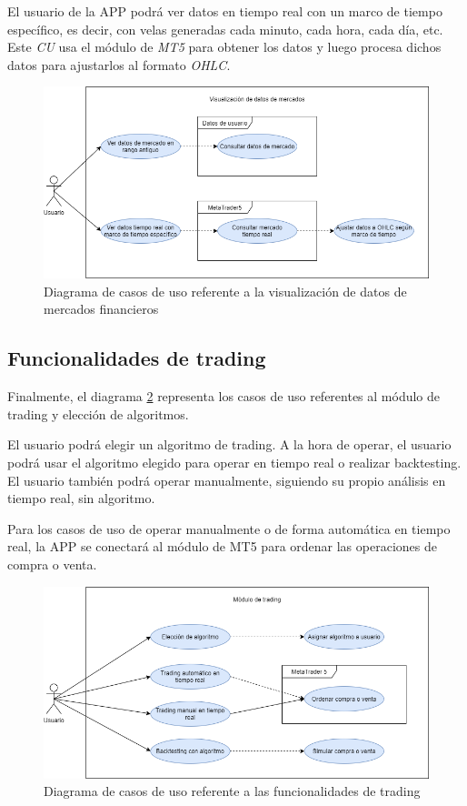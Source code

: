 El usuario de la APP podrá ver datos en tiempo real con un marco de tiempo específico, es decir, con velas generadas cada minuto, cada hora, cada día, etc. Este \textit{CU} usa el módulo de \textit{MT5} para obtener los datos y luego procesa dichos datos para ajustarlos al formato \textit{OHLC}.


\begin{figure}[h] 
	\includegraphics[width=1\textwidth]{imagenes/diagramas_casos_de_uso/CU3-visualizacion_datos.png} 
	\caption{Diagrama de casos de uso referente a la visualización de datos de mercados financieros} \label{cu3}
\end{figure}


\subsection{Funcionalidades de trading}

Finalmente, el diagrama \ref{cu4} representa los casos de uso referentes al módulo de trading y elección de algoritmos. \newline

El usuario podrá elegir un algoritmo de trading. A la hora de operar, el usuario podrá usar el algoritmo elegido para operar en tiempo real o realizar backtesting. El usuario también podrá operar manualmente, siguiendo su propio análisis en tiempo real, sin algoritmo. \newline

Para los casos de uso de operar manualmente o de forma automática en tiempo real, la APP se conectará al módulo de MT5 para ordenar las operaciones de compra o venta.


\begin{figure}[h] 
	\includegraphics[width=1\textwidth]{imagenes/diagramas_casos_de_uso/CU4-algoritmos.png} 
	\caption{Diagrama de casos de uso referente a las funcionalidades de trading} \label{cu4}
\end{figure}
